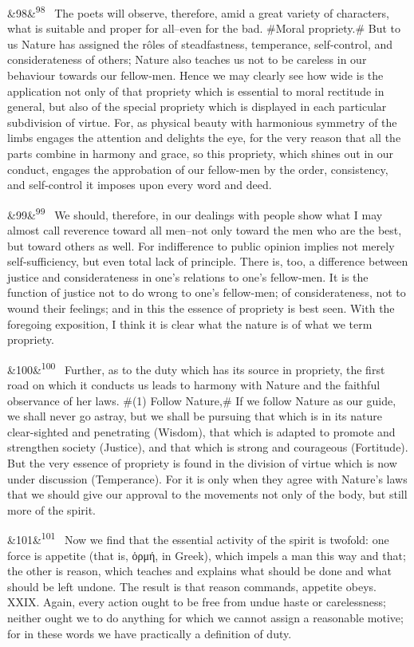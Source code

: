 \documentclass[12pt]{article}
\newcommand{\para}[1][]{\par\noindent\ifx&#1&\else\textsuperscript{\footnotesize #1}~\fi}
\begin{document}
\para[98] The poets will observe, therefore, amid a great variety of characters, what is suitable and proper for all--even for the bad. \#Moral propriety.\# But to us Nature has assigned the rôles of steadfastness, temperance, self-control, and considerateness of others; Nature also teaches us not to be careless in our behaviour towards our fellow-men. Hence we may clearly see how wide is the application not only of that propriety which is essential to moral rectitude in general, but also of the special propriety which is displayed in each particular subdivision of virtue. For, as physical beauty with harmonious symmetry of the limbs engages the attention and delights the eye, for the very reason that all the parts combine in harmony and grace, so this propriety, which shines out in our conduct, engages the approbation of our fellow-men by the order, consistency, and self-control it imposes upon every word and deed.

\para[99] We should, therefore, in our dealings with people show what I may almost call reverence toward all men--not only toward the men who are the best, but toward others as well. For indifference to public opinion implies not merely self-sufficiency, but even total lack of principle. There is, too, a difference between justice and considerateness in one's relations to one's fellow-men. It is the function of justice not to do wrong to one's fellow-men; of considerateness, not to wound their feelings; and in this the essence of propriety is best seen. With the foregoing exposition, I think it is clear what the nature is of what we term propriety.

\para[100] Further, as to the duty which has its source in propriety, the first road on which it conducts us leads to harmony with Nature and the faithful observance of her laws. \#(1) Follow Nature,\# If we follow Nature as our guide, we shall never go astray, but we shall be pursuing that which is in its nature clear-sighted and penetrating (Wisdom), that which is adapted to promote and strengthen society (Justice), and that which is strong and courageous (Fortitude). But the very essence of propriety is found in the division of virtue which is now under discussion (Temperance). For it is only when they agree with Nature's laws that we should give our approval to the movements not only of the body, but still more of the spirit.

\para[101] Now we find that the essential activity of the spirit is twofold: one force is appetite (that is, ὁρμή, in Greek), which impels a man this way and that; the other is reason, which teaches and explains what should be done and what should be left undone. The result is that reason commands, appetite obeys. XXIX. Again, every action ought to be free from undue haste or carelessness; neither ought we to do anything for which we cannot assign a reasonable motive; for in these words we have practically a definition of duty.
\end{document}
